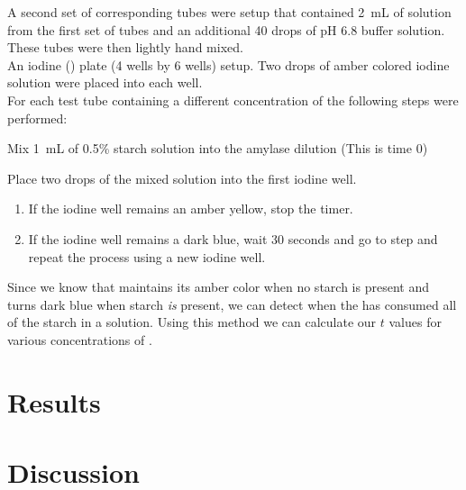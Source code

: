 \documentclass{article}
\begin{document}
A second set of corresponding tubes were setup that contained \SI{2}{mL} of \aamylase solution from
the first set of tubes and an additional 40 drops of pH 6.8 buffer solution. These tubes were then
lightly hand mixed. \\

An iodine () plate (4 wells by 6 wells) setup. Two drops of amber colored iodine solution were placed
into each well. \\


For each test tube containing a different concentration of \aamylase the following steps were
performed:

\begin{steps}
    \item Mix \SI{1}{mL} of 0.5\% starch solution into the amylase dilution (This is time 0)
    \item Place two drops of the mixed solution into the first iodine well.
        \begin{enumerate}
            \item If the iodine well remains an amber yellow, stop the timer.
            \item If the iodine well remains a dark blue, wait 30 seconds and
                go to step and repeat the process using a new iodine well.
        \end{enumerate}
\end{steps}

Since we know that  maintains its amber color when no starch is present and turns dark
blue when starch \emph{is} present, we can detect when the \aamylase has consumed all of the
starch in a solution. Using this method we can calculate our $t$ values for various concentrations
of \aamylase.

\section{Results}
\label{sec:results}

\section{Discussion}
\label{sec:discussion}




\end{document}
